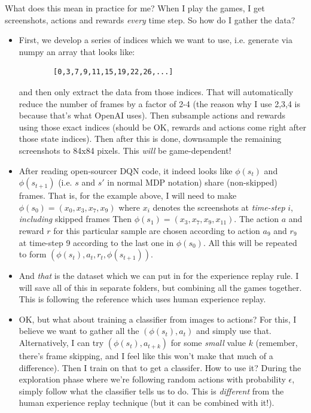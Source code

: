 \documentclass[letterpaper, 10pt, conference]{ieeeconf}
\begin{document}
    What does this mean in practice for me? When I play the games, I get
    screenshots, actions and rewards \emph{every} time step. So how do I gather
    the data?

\begin{itemize}
        \item First, we develop a series of indices which we want to use, i.e.
        generate via numpy an array that looks like:
        \begin{verbatim}
        [0,3,7,9,11,15,19,22,26,...]
        \end{verbatim}
        and then only extract the data from those indices. That will
        automatically reduce the number of frames by a factor of 2-4 (the reason
        why I use 2,3,4 is because that's what OpenAI uses). Then subsample
        actions and rewards using those exact indices (should be OK, rewards and
        actions come right after those state indices). Then after this is done,
        downsample the remaining screenshots to 84x84 pixels. This \emph{will}
        be game-dependent!

        \item After reading open-sourcer DQN code, it indeed looks like
        $\phi(s_t)$ and $\phi(s_{t+1})$ (i.e. $s$ and $s'$ in normal MDP
        notation) share (non-skipped) frames. That is, for the example above, I
        will need to make $\phi(s_0) = (x_0,x_3,x_7,x_9)$ where $x_i$ denotes
        the screenshots at \emph{time-step} $i$, \emph{including} skipped frames
        Then $\phi(s_1) = (x_3,x_7,x_9,x_{11})$. The action $a$ and reward $r$
        for this particular sample are chosen according to action $a_9$ and
        $r_9$ at time-step 9 according to the last one in $\phi(s_0)$. All this
        will be repeated to form $(\phi(s_t),a_t,r_t,\phi(s_{t+1}))$.

        \item And \emph{that} is the dataset which we can put in for the
        experience replay rule. I will save all of this in separate folders, but
        combining all the games together. This is following the reference which
        uses human experience replay.

        \item OK, but what about training a classifier from images to actions?
        For this, I believe we want to gather all the $(\phi(s_t),a_t)$ and
        simply use that. Alternatively, I can try $(\phi(s_t),a_{t+k})$ for some
        \emph{small} value $k$ (remember, there's frame skipping, and I feel
        like this won't make that much of a difference). Then I train on that to
        get a classifer. How to use it? During the exploration phase where we're
        following random actions with probability $\epsilon$, simply follow what
        the classifier tells us to do. This is \emph{different} from the human
        experience replay technique (but it can be combined with it!).
\end{itemize}
\end{document}
